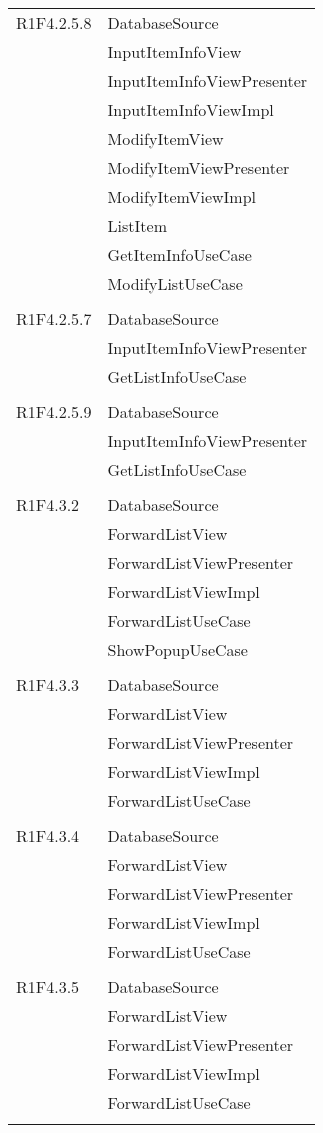 \begin{center}
\begin{longtable}{|p{7cm}|p{5cm}|}
		R1F4.2.5.8 & DatabaseSource \\ & InputItemInfoView \\ & InputItemInfoViewPresenter \\ & InputItemInfoViewImpl \\ & ModifyItemView \\ & ModifyItemViewPresenter \\ & ModifyItemViewImpl \\ & ListItem \\ & GetItemInfoUseCase \\ & ModifyListUseCase \\ & \\ \hline
		R1F4.2.5.7 & DatabaseSource \\ & InputItemInfoViewPresenter \\ & GetListInfoUseCase \\ & \\ \hline
		R1F4.2.5.9 & DatabaseSource \\ & InputItemInfoViewPresenter \\ & GetListInfoUseCase \\ & \\ \hline
		R1F4.3.2 & DatabaseSource \\ & ForwardListView \\ & ForwardListViewPresenter \\ & ForwardListViewImpl \\ & ForwardListUseCase \\ & ShowPopupUseCase \\ & \\ \hline
		R1F4.3.3 & DatabaseSource \\ & ForwardListView \\ & ForwardListViewPresenter \\ & ForwardListViewImpl \\ & ForwardListUseCase \\ & \\ \hline
		R1F4.3.4 & DatabaseSource \\ & ForwardListView \\ & ForwardListViewPresenter \\ & ForwardListViewImpl \\ & ForwardListUseCase \\ & \\ \hline
		R1F4.3.5 & DatabaseSource \\ & ForwardListView \\ & ForwardListViewPresenter \\ & ForwardListViewImpl \\ & ForwardListUseCase \\ & \\ \hline

\end{longtable}
\end{center}
